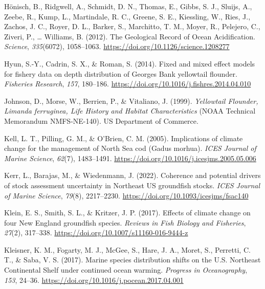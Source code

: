 \documentclass[
  12pt,
]{article}
\newlength{\cslhangindent}
\newenvironment{CSLReferences}[2] %
 {\begin{list}{}{%
  \setlength{\itemindent}{0pt}
  \setlength{\leftmargin}{0pt}
  \setlength{\parsep}{0pt}
  \ifodd #1
   \setlength{\leftmargin}{\cslhangindent}
   \setlength{\itemindent}{-1\cslhangindent}
  \fi
  \setlength{\itemsep}{#2\baselineskip}}}
 {\end{list}}
\begin{document}
\begin{CSLReferences}{1}{2}
Hönisch, B., Ridgwell, A., Schmidt, D. N., Thomas, E., Gibbs, S. J., Sluijs, A., Zeebe, R., Kump, L., Martindale, R. C., Greene, S. E., Kiessling, W., Ries, J., Zachos, J. C., Royer, D. L., Barker, S., Marchitto, T. M., Moyer, R., Pelejero, C., Ziveri, P., \ldots{} Williams, B. (2012). The {Geological Record} of {Ocean Acidification}. \emph{Science}, \emph{335}(6072), 1058--1063. \url{https://doi.org/10.1126/science.1208277}

Hyun, S.-Y., Cadrin, S. X., \& Roman, S. (2014). Fixed and mixed effect models for fishery data on depth distribution of Georges Bank yellowtail flounder. \emph{Fisheries Research}, \emph{157}, 180--186. \url{https://doi.org/10.1016/j.fishres.2014.04.010}

Johnson, D., Morse, W., Berrien, P., \& Vitaliano, J. (1999). \emph{Yellowtail {Flounder}, {Limanda} ferruginea, {Life History} and {Habitat Characteristics}} (NOAA Technical Memorandum NMFS-NE-140). US Department of Commerce.

Kell, L. T., Pilling, G. M., \& O'Brien, C. M. (2005). Implications of climate change for the management of {North Sea} cod ({Gadus} morhua). \emph{ICES Journal of Marine Science}, \emph{62}(7), 1483--1491. \url{https://doi.org/10.1016/j.icesjms.2005.05.006}

Kerr, L., Barajas, M., \& Wiedenmann, J. (2022). Coherence and potential drivers of stock assessment uncertainty in Northeast US groundfish stocks. \emph{ICES Journal of Marine Science}, \emph{79}(8), 2217--2230. \url{https://doi.org/10.1093/icesjms/fsac140}

Klein, E. S., Smith, S. L., \& Kritzer, J. P. (2017). Effects of climate change on four New England groundfish species. \emph{Reviews in Fish Biology and Fisheries}, \emph{27}(2), 317--338. \url{https://doi.org/10.1007/s11160-016-9444-z}

Kleisner, K. M., Fogarty, M. J., McGee, S., Hare, J. A., Moret, S., Perretti, C. T., \& Saba, V. S. (2017). Marine species distribution shifts on the U.S. Northeast Continental Shelf under continued ocean warming. \emph{Progress in Oceanography}, \emph{153}, 24--36. \url{https://doi.org/10.1016/j.pocean.2017.04.001}


\end{CSLReferences}
\end{document}
